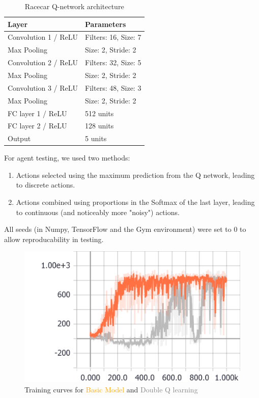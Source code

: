 \documentclass[a4paper, 11pt, conference]{ieeeconf}      %
\begin{document}
\begin{table}
  \centering
  \caption{Racecar Q-network architecture}
  \label{table:agent1}
  \begin{tabular}{ll}
  Layer & Parameters \\ \hline
  Convolution 1 / ReLU & Filters: 16, Size: 7 \\
  Max Pooling & Size: 2, Stride: 2\\
  Convolution 2 / ReLU & Filters: 32, Size: 5 \\
  Max Pooling & Size: 2, Stride: 2\\
  Convolution 3 / ReLU & Filters: 48, Size: 3 \\
  Max Pooling & Size: 2, Stride: 2\\
  FC layer 1 / ReLU & 512 units\\
  FC layer 2 / ReLU & 128 units\\
  Output & 5 units\\
  \end{tabular}
  \end{table}

For agent testing, we used two methods:

\begin{enumerate}
	\item Actions selected using the maximum prediction from the Q network, leading to discrete actions.
	\item Actions combined using proportions in the Softmax of the last layer, leading to continuous (and noticeably more "noisy") actions.
\end{enumerate}

All seeds (in Numpy, TensorFlow and the Gym environment) were set to 0 to allow reproducability in testing.

\begin{figure}
  \includegraphics[width=\linewidth]{figs/racecar_train_1.png}
  \caption{Training curves for \textcolor{orange}{Basic Model} and \textcolor{gray}{Double Q learning}}
  \label{fig:train1}
\end{figure}
\end{document}
